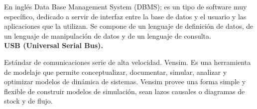 \documentclass[../pfc.tex]{subfiles}
\begin{document}
	En inglés Data Base Management System (DBMS); es
	un tipo de software muy específico, dedicado a servir de interfaz entre la base de datos y el usuario
	y las aplicaciones que la utilizan. Se compone de un lenguaje de definición de datos, de un lenguaje
	de manipulación de datos y de un lenguaje de consulta.\\
	
	\textbf{USB (Universal Serial Bus).}
	
	Estándar de comunicaciones serie de alta velocidad.
	Vensim. Es una herramienta de modelaje que permite conceptualizar, documentar, simular,
	analizar y optimizar modelos de dinámica de sistemas. Vensim provee una forma simple y flexible
	de construir modelos de simulación, sean lazos causales o diagramas de stock y de flujo.\\
	
	
\end{document}
